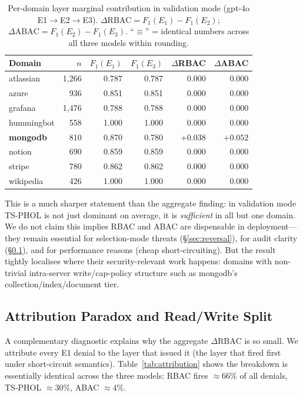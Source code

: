 \documentclass[10pt,a4paper,twocolumn]{article}
\begin{document}
\begin{table}[!t]
\centering
\caption{Per-domain layer marginal contribution in validation mode (gpt-4o E1$\to$E2$\to$E3). $\Delta\mathrm{RBAC} = F_1(E_1) - F_1(E_2)$; $\Delta\mathrm{ABAC} = F_1(E_2) - F_1(E_3)$. ``$\equiv$'' = identical numbers across all three models within rounding.}
\label{tab:per_domain_delta}
\scriptsize
\setlength{\tabcolsep}{3pt}
\begin{tabular}{@{}lrrrrr@{}}
\toprule
\textbf{Domain} & $n$ & $F_1(E_1)$ & $F_1(E_3)$ & $\Delta$\textbf{RBAC} & $\Delta$\textbf{ABAC} \\
\midrule
atlassian       & 1{,}266 & 0.787 & 0.787 & $0.000$ & $0.000$ \\
azure           & 936     & 0.851 & 0.851 & $0.000$ & $0.000$ \\
grafana         & 1{,}476 & 0.788 & 0.788 & $0.000$ & $0.000$ \\
hummingbot      & 558     & 1.000 & 1.000 & $0.000$ & $0.000$ \\
\textbf{mongodb} & 810   & 0.870 & 0.780 & $+0.038$ & $+0.052$ \\
notion          & 690     & 0.859 & 0.859 & $0.000$ & $0.000$ \\
stripe          & 780     & 0.862 & 0.862 & $0.000$ & $0.000$ \\
wikipedia       & 426     & 1.000 & 1.000 & $0.000$ & $0.000$ \\
\bottomrule
\end{tabular}
\end{table}

This is a much sharper statement than the aggregate finding: in validation mode TS-PHOL is not just dominant on average, it is \emph{sufficient} in all but one domain. We do not claim this implies RBAC and ABAC are dispensable in deployment---they remain essential for selection-mode threats (\S\ref{sec:reversal}), for audit clarity (\S\ref{sec:attribution_paradox}), and for performance reasons (cheap short-circuiting). But the result tightly localises where their security-relevant work happens: domains with non-trivial intra-server write/cap-policy structure such as mongodb's collection/index/document tier.

\subsection{Attribution Paradox and Read/Write Split}
\label{sec:attribution_paradox}

A complementary diagnostic explains why the aggregate $\Delta\mathrm{RBAC}$ is so small. We attribute every E1 denial to the layer that issued it (the layer that fired first under short-circuit semantics). Table~\ref{tab:attribution} shows the breakdown is essentially identical across the three models: RBAC fires $\approx 66\%$ of all denials, TS-PHOL $\approx 30\%$, ABAC $\approx 4\%$.
\end{document}
